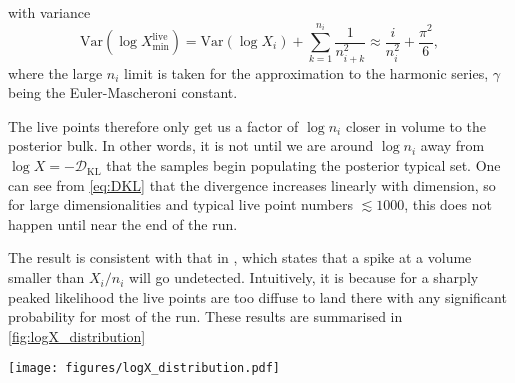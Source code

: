 \documentclass[usenatbib]{mnras}
\newcommand{\nlive}{n_i}
\newcommand{\DKL}{\mathcal{D}_\mathrm{KL}}
\begin{document}
with variance
\begin{equation}
    \mathrm{Var}(\log X_\mathrm{min}^{\mathrm{live}}) = \mathrm{Var}(\log X_i) + \sum_{k=1}^{\nlive} \frac{1}{n_{i+k}^2} \approx \frac{i}{\nlive^2} + \frac{\pi^2}{6}, 
\end{equation}
where the large $\nlive$ limit is taken for the approximation to the harmonic series, $\gamma$ being the Euler-Mascheroni constant.
\par
The live points therefore only get us a factor of $\log \nlive$ closer in volume to the posterior bulk. In other words, it is not until we are around $\log \nlive$ away from $\log X = -\DKL$ that the samples begin populating the posterior typical set. One can see from \cref{eq:DKL} that the divergence increases linearly with dimension, so for large dimensionalities and typical live point numbers $\lesssim 1000$, this does not happen until near the end of the run.
\par
The result is consistent with that in \citet{statmech}, which states that a spike at a volume smaller than $X_i/n_i$ will go undetected. Intuitively, it is because for a sharply peaked likelihood the live points are too diffuse to land there with any significant probability for most of the run. These results are summarised in \cref{fig:logX_distribution}
\begin{figure*}
\begin{center}
    \texttt{[image: figures/logX\_distribution.pdf]}
\end{center}
\caption{The distribution of the posterior mass in terms of $\log X$, the live points over the constrained prior and the smallest live point prior volume $\log X_\mathrm{min}^{\mathrm{live}}$ at an intermediate iteration $i$. For large values of $\DKL$ i.e. informative posteriors and/or large dimensionalities, the maximum live point is very far from the posterior bulk until the very end of the run. Note that the x-axis in this plot is $\log X$, so that the run proceeds from right to left to emphasise that the enclosed prior volume iteratively gets smaller. Plots of the sort from here onward will be in terms of $-\log X$, where the run will more naturally proceed from left to right. }
\label{fig:logX_distribution}
\end{figure*}
\end{document}
